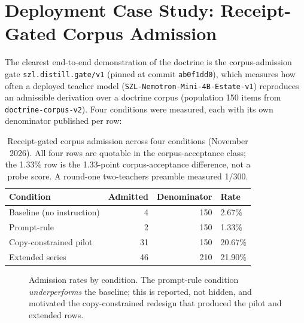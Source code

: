 
\section{Deployment Case Study: Receipt-Gated Corpus Admission}
\label{sec:deploy}

The clearest end-to-end demonstration of the doctrine is the corpus-admission gate \texttt{szl.distill.gate/v1} (pinned at commit \texttt{ab0f1dd0}), which measures how often a deployed teacher model (\texttt{SZL-Nemotron-Mini-4B-Estate-v1}) reproduces an admissible derivation over a doctrine corpus (population 150 items from \texttt{doctrine-corpus-v2}). Four conditions were measured, each with its own denominator published per row:

\begin{table}[htbp]
\centering
\small
\begin{tabular}{lrrl}
\toprule
\textbf{Condition} & \textbf{Admitted} & \textbf{Denominator} & \textbf{Rate} \\
\midrule
Baseline (no instruction) & 4 & 150 & 2.67\% \\
Prompt-rule & 2 & 150 & 1.33\% \\
Copy-constrained pilot & 31 & 150 & 20.67\% \\
Extended series & 46 & 210 & 21.90\% \\
\bottomrule
\end{tabular}
\caption{Receipt-gated corpus admission across four conditions (November 2026). All four rows are quotable in the corpus-acceptance class; the 1.33\% row is the 1.33-point corpus-acceptance difference, not a probe score. A round-one two-teachers preamble measured 1/300.}
\label{tab:gates}
\end{table}

\begin{figure}[htbp]
\centering
{}
\caption{Admission rates by condition. The prompt-rule condition \emph{underperforms} the baseline; this is reported, not hidden, and motivated the copy-constrained redesign that produced the pilot and extended rows.}
\label{fig:gates}
\end{figure}

